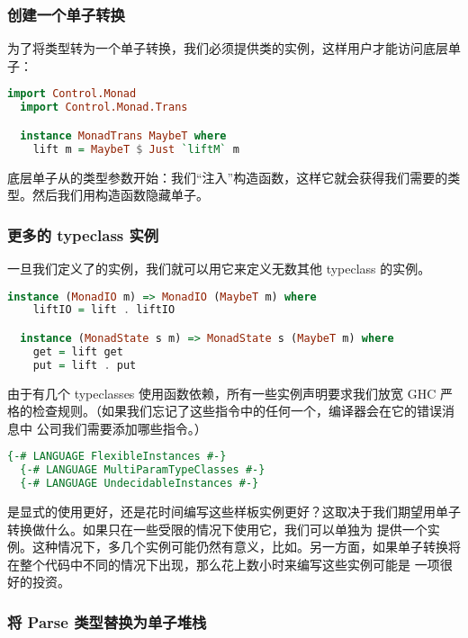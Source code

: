 \documentclass[./main.tex]{subfiles}
\begin{document}
\subsubsection*{创建一个单子转换}

为了将类型转为一个单子转换，我们必须提供类的实例，这样用户才能访问底层单子：

\begin{lstlisting}[language=Haskell]
  import Control.Monad
  import Control.Monad.Trans

  instance MonadTrans MaybeT where
    lift m = MaybeT $ Just `liftM` m
\end{lstlisting}

底层单子从的类型参数开始：我们“注入”构造函数，这样它就会获得我们需要的类型。然后我们用构造函数隐藏单子。

\subsubsection*{更多的 typeclass 实例}

一旦我们定义了的实例，我们就可以用它来定义无数其他 typeclass 的实例。

\begin{lstlisting}[language=Haskell]
  instance (MonadIO m) => MonadIO (MaybeT m) where
    liftIO = lift . liftIO

  instance (MonadState s m) => MonadState s (MaybeT m) where
    get = lift get
    put = lift . put
\end{lstlisting}

由于有几个 typeclasses 使用函数依赖，所有一些实例声明要求我们放宽 GHC 严格的检查规则。（如果我们忘记了这些指令中的任何一个，编译器会在它的错误消息中
公司我们需要添加哪些指令。）

\begin{lstlisting}[language=Haskell]
  {-# LANGUAGE FlexibleInstances #-}
  {-# LANGUAGE MultiParamTypeClasses #-}
  {-# LANGUAGE UndecidableInstances #-}
\end{lstlisting}

是显式的使用更好，还是花时间编写这些样板实例更好？这取决于我们期望用单子转换做什么。如果只在一些受限的情况下使用它，我们可以单独为
提供一个实例。这种情况下，多几个实例可能仍然有意义，比如。另一方面，如果单子转换将在整个代码中不同的情况下出现，那么花上数小时来编写这些实例可能是
一项很好的投资。

\subsubsection*{将 Parse 类型替换为单子堆栈}
\end{document}
